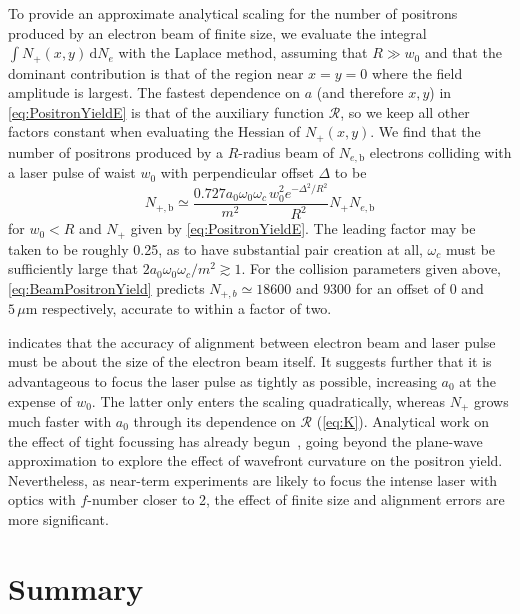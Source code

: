 \documentclass[reprint,superscriptaddress,amsmath,amssymb,aps,pra]{revtex4-1}
\newcommand{\micron}{{\mu\mathrm{m}}}
\newcommand{\rmd}{\mathrm{d}}
\newcommand{\aux}{\mathcal{R}}
\begin{document}
To provide an approximate analytical scaling for the number of positrons
produced by an electron beam of finite size, we evaluate
the integral $\int\!N_+(x,y)\,\rmd N_e$ with the Laplace method,
assuming that $R \gg w_0$ and that the dominant contribution is that of the
region near $x = y = 0$ where the field amplitude is largest.
The fastest dependence on $a$ (and therefore $x,y$) in \cref{eq:PositronYieldE}
is that of the auxiliary function $\aux$, so we keep all other
factors constant when evaluating the Hessian of $N_+(x,y)$. We find that
the number of positrons produced by a $R$-radius beam of $N_{e,\mathrm{b}}$ electrons
colliding with a laser pulse of waist $w_0$ with perpendicular
offset $\Delta$ to be
	\begin{equation}
	N_{+,\mathrm{b}} \simeq
		\frac{0.727 a_0 \omega_0 \omega_c}{m^2}
		\frac{w_0^2 e^{-\Delta^2/R^2}}{R^2}
		N_+
		N_{e,\mathrm{b}}
	\label{eq:BeamPositronYield}
	\end{equation}
for $w_0 < R$ and $N_+$ given by \cref{eq:PositronYieldE}. The leading factor may
be taken to be roughly 0.25, as to have substantial pair creation at all, $\omega_c$
must be sufficiently large that $2 a_0 \omega_0 \omega_c / m^2
\gtrsim 1$. For the collision parameters given above, \cref{eq:BeamPositronYield}
predicts $N_{+,b} \simeq 18600$ and $9300$ for an offset of $0$ and $5\,\micron$
respectively, accurate to within a factor of two.

 indicates that the accuracy of alignment
between electron beam and laser pulse must be about
the size of the electron beam itself. It
suggests further that it is advantageous to focus the laser pulse as tightly
as possible, increasing $a_0$ at the expense of $w_0$. The latter only
enters the scaling quadratically, whereas $N_+$ grows much faster with
$a_0$ through its dependence on $\aux$ (\cref{eq:K}).
Analytical work on the effect of tight focussing has already
begun~\cite{DiPiazza,DiPiazza2}, going beyond the plane-wave approximation
to explore the effect of wavefront curvature on the positron yield.
Nevertheless, as near-term experiments are likely to focus the intense
laser with optics with $f$-number closer to 2, the effect of finite
size and alignment errors are more significant.

\section{Summary}
\end{document}
